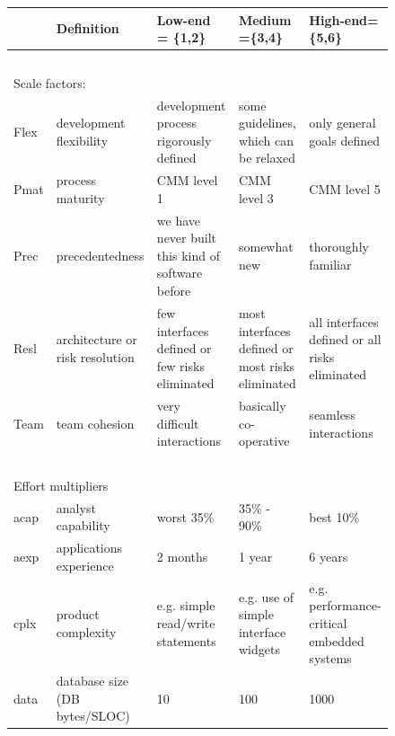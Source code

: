 \documentclass[final,twocolumn]{elsarticle}
\theoremstyle{break}
\begin{document}
 \begin{figure}[!t]
{\scriptsize
\begin{center}
\begin{tabular}{|p{0.2in}|p{1.46in}|p{1.5in}|p{1.5in}|p{1.5in}|}\hline

 & Definition & Low-end = \{1,2\}
 &Medium =\{3,4\} &High-end= \{5,6\} \\\hline

\multicolumn{1}{c}{~}\\

\multicolumn{5}{l}{Scale factors:}\\\hline
Flex   &  development flexibility   & development process
rigorously defined & some guidelines, which can be relaxed & only
general goals defined\\\hline

Pmat    & process maturity  &  CMM level 1 &   CMM level 3  &  CMM level 5 \\\hline

Prec & precedentedness  &  we have never built this kind
of software before &    somewhat new &
thoroughly familiar \\\hline

Resl &  architecture or risk resolution  &  few interfaces
defined or few risks eliminated  &  most interfaces defined or most
risks eliminated   & all interfaces defined or all risks
eliminated\\\hline

Team  &   team cohesion  &  very difficult interactions &
basically co-operative  &  seamless interactions\\\hline

\multicolumn{1}{c}{~}\\

\multicolumn{5}{l}{Effort multipliers}\\\hline
acap  &  analyst capability  &  worst 35\% &   35\% - 90\% &  best 10\% \\\hline

aexp   &  applications experience  &  2 months &   1 year  &  6 years\\\hline

cplx   &  product complexity   & e.g. simple read/write
statements & e.g. use of simple interface widgets  &  e.g.
performance-critical embedded systems\\\hline

data   &  database size 
(DB bytes/SLOC) &
10 & 100 &    1000 \\\hline


\end{tabular}
\end{center}}
\end{figure}
\end{document}
